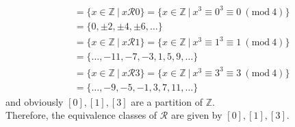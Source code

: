 \documentclass[12pt]{article}
\begin{document}
\begin{align*}
[0] &= \{x \in \mathbb{Z} ~|~ x \mathcal{R} 0 \} = \{x \in \mathbb{Z} ~|~ x^3 \equiv 0^3 \equiv 0 ~\left(\mathrm{mod}~4\right)\} \\[1em]
&= \{0, \pm 2, \pm 4, \pm 6, \dots\}
\end{align*}
\begin{align*}
[1] &= \{x \in \mathbb{Z} ~|~ x \mathcal{R} 1 \} = \{x \in \mathbb{Z} ~|~ x^3 \equiv 1^3 \equiv 1 ~\left(\mathrm{mod}~4\right)\} \\[1em]
&= \{ \dots, -11, -7, -3, 1, 5, 9, \dots \}
\end{align*}
\begin{align*}
[3] &= \{x \in \mathbb{Z} ~|~ x \mathcal{R} 3 \} = \{x \in \mathbb{Z} ~|~ x^3 \equiv 3^3 \equiv 3 ~\left(\mathrm{mod}~4\right)\} \\[1em]
&= \{ \dots, -9, -5, -1, 3, 7, 11, \dots \}
\end{align*}
and obviously $[0], [1], [3]$ are a partition of $\mathbb{Z}$.\\[1em]
Therefore, the equivalence classes of $\mathcal{R}$ are given by $[0], [1], [3]$.
\end{document}
